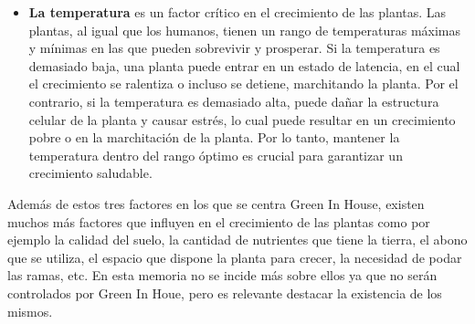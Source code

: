\begin{itemize}
    \item \textbf{La temperatura} es un factor crítico en el crecimiento de las plantas. Las plantas, al igual que los humanos, tienen un rango de temperaturas máximas y mínimas en las que pueden sobrevivir y prosperar. Si la temperatura es demasiado baja, una planta puede entrar en un estado de latencia, en el cual el crecimiento se ralentiza o incluso se detiene, marchitando la planta. Por el contrario, si la temperatura es demasiado alta, puede dañar la estructura celular de la planta y causar estrés, lo cual puede resultar en un crecimiento pobre o en la marchitación de la planta. Por lo tanto, mantener la temperatura dentro del rango óptimo es crucial para garantizar un crecimiento saludable.   
\end{itemize}
Además de estos tres factores en los que se centra Green In House, existen muchos más factores que influyen en el crecimiento de las plantas como por ejemplo la calidad del suelo, la cantidad de nutrientes que tiene la tierra, el abono que se utiliza, el espacio que dispone la planta para crecer, la necesidad de podar las ramas, etc. En esta memoria no se incide más sobre ellos ya que no serán controlados por Green In Houe, pero es relevante destacar la existencia de los mismos.

